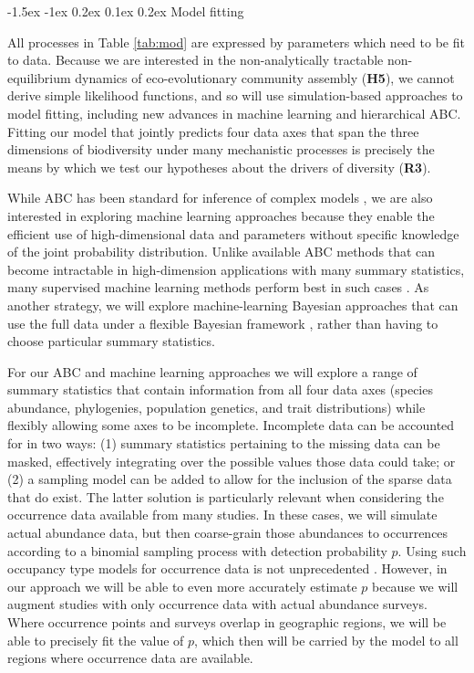 \documentclass[11pt]{article}
\makeatletter
\renewcommand\subsubsection{\@startsection{subsection}{1}{\z@}%
                                  {-1.5ex \@plus -1ex \@minus 0.2ex}%
                                  {0.1ex \@plus 0.2ex}%
                                  {\normalfont\bfseries}}
\makeatother
\begin{document}
\subsubsection{Model fitting}\label{model-fitting}

All processes in Table \ref{tab:mod} are expressed by parameters which
need to be fit to data. Because we are interested in the
non-analytically tractable non-equilibrium dynamics of
eco-evolutionary community assembly (\textbf{H5}), we cannot derive
simple likelihood functions, and so will use simulation-based
approaches to model fitting, including new advances in machine
learning and hierarchical ABC. Fitting our model that jointly predicts
four data axes that span the three dimensions of biodiversity under
many mechanistic processes is precisely the means by which we test our
hypotheses about the drivers of diversity (\textbf{R3}).

While ABC has been standard for inference of complex models
\cite{Beaumont2010-si}, we are also interested in exploring machine
learning approaches because they enable the efficient use of
high-dimensional data and parameters without specific knowledge of the
joint probability distribution. Unlike available ABC methods that can
become intractable in high-dimension applications with many summary
statistics, many supervised machine learning methods perform best in
such cases \cite{Anderson2014-fi,Breiman2001-ux}. As another strategy,
we will explore machine-learning Bayesian approaches that can use the
full data under a flexible Bayesian framework \cite{Chan2018-qh}, rather
than having to choose particular summary statistics.

For our ABC and machine learning approaches we will explore a range of
summary statistics that contain information from all four data axes
(species abundance, phylogenies, population genetics, and trait
distributions) while flexibly allowing some axes to be incomplete.
Incomplete data can be accounted for in two ways: (1) summary statistics
pertaining to the missing data can be masked, effectively integrating
over the possible values those data could take; or (2) a sampling model
can be added to allow for the inclusion of the sparse data that do
exist. The latter solution is particularly relevant when considering the
occurrence data available from many studies. In these cases, we will
simulate actual abundance data, but then coarse-grain those abundances
to occurrences according to a binomial sampling process with detection
probability $p$. Using such occupancy type models for occurrence data
is not unprecedented \cite{Tingley2009-kt}. However, in our approach we
will be able to even more accurately estimate $p$ because we will
augment studies with only occurrence data with actual abundance surveys.
Where occurrence points and surveys overlap in geographic regions, we
will be able to precisely fit the value of $p$, which then will be
carried by the model to all regions where occurrence data are available.
\end{document}
